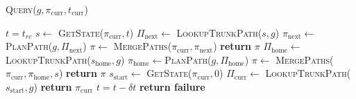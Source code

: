 \documentclass[letterpaper]{article} %
\begin{document}
\begin{algorithm}
\caption{\textsc{Query}($g, \pi_{\textrm{curr}},t_{\textrm{curr}}$)}\label{alg:1}
\begin{algorithmic}[1]
\State $t = t_{rc}$
    \State $s \leftarrow$ \textsc{GetState}($\pi_{\textrm{curr}}, t$)
    \State $\Pi_{\textrm{next}} \leftarrow$  \textsc{LookupTrunkPath}($s,g$)
        \State $\pi_{\textrm{next}} \leftarrow$\textsc{PlanPath}($g,\Pi_{\textrm{next}}$)
        \State $\pi \leftarrow$ \textsc{MergePaths}($\pi_{\textrm{curr}},\pi_{\textrm{next}}$)
        \State \textbf{return} $\pi$
    \Else
        {\color{blue}
        \State $\Pi_{\textrm{home}} \leftarrow$ \textsc{LookupTrunkPath}($s_{\textrm{home}},g$)
                \State $\pi_{\textrm{home}} \leftarrow$\textsc{PlanPath}($g,\Pi_{\textrm{home}}$)
                \State $\pi \leftarrow$ \textsc{MergePaths}($\pi_{\textrm{curr}},\pi_{\textrm{home}}, s$)
                \State \textbf{return} $\pi$
            \EndIf
        \EndIf
        \State $s_{\textrm{start}} \leftarrow$ \textsc{GetState}($\pi_{\textrm{curr}}, 0$)
        \State $\Pi_{\textrm{curr}} \leftarrow$ \textsc{LookupTrunkPath}($s_{\textrm{start}},g$)
            \State \textbf{return} $\pi_{\textrm{curr}}$
        \EndIf
        }
    \EndIf
    \State $t = t - \delta t$
\EndWhile
\State \textbf{return failure}
\end{algorithmic}
\end{algorithm}
\end{document}
